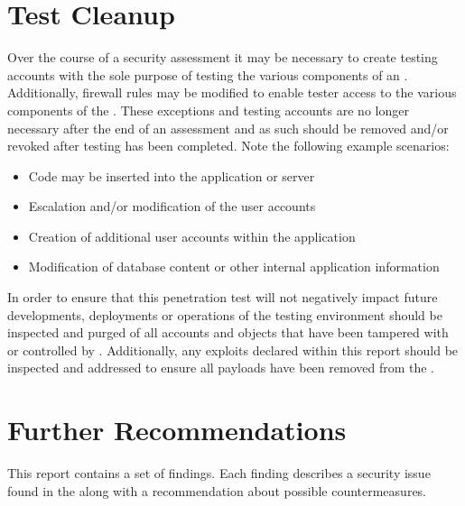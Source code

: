 \section{Test Cleanup}
\label{section:TestCleanup}

Over the course of a security assessment it may be necessary to create testing accounts with the sole purpose of testing the various components of an \PrintAssetName. Additionally, firewall rules may be modified to enable tester access to the various components of the \PrintAssetName. These exceptions and testing accounts are no longer necessary after the end of an assessment and as such should be removed and/or revoked after testing has been completed. Note the following example scenarios:

\begin{itemize}
	\item	Code may be inserted into the application or server
	\item	Escalation and/or modification of the user accounts
	\item	Creation of additional user accounts within the application
	\item	Modification of database content or other internal application information
\end{itemize}

In order to ensure that this penetration test will not negatively impact future developments, deployments or operations of the testing environment should be inspected and purged of all accounts and objects that have been tampered with or controlled by \ReportAssessmentTeamLong. Additionally, any exploits declared within this report should be inspected and addressed to ensure all payloads have been removed from the \PrintAssetName.


\section{Further Recommendations}
\label{section:FurtherRecommendations}

This report contains a set of findings. Each finding describes a security issue found in the \PrintAssetName along with a recommendation about possible countermeasures.

